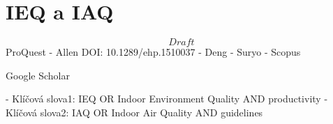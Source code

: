 \section{IEQ a IAQ}

\[Draft\]
ProQuest 
 - Allen DOI: 10.1289/ehp.1510037 
 - Deng
 - Suryo
 - 
Scopus

Google Scholar

- Klíčová slova1: IEQ OR Indoor Environment Quality AND productivity
- Klíčová slova2: IAQ OR Indoor Air Quality AND guidelines

